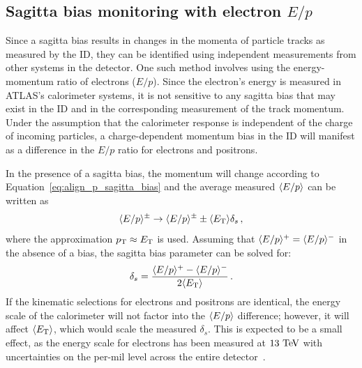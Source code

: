 \subsection{Sagitta bias monitoring with electron $E/p$}\label{align:eop}
Since a sagitta bias results in changes in the momenta of particle tracks as measured by the ID, they can be identified using independent measurements from other systems in the detector.
One such method involves using the energy-momentum ratio of electrons ($E/p$).
Since the electron's energy is measured in ATLAS's calorimeter systems, it is not sensitive to any sagitta bias that may exist in the ID and in the corresponding measurement of the track momentum.
Under the assumption that the calorimeter response is independent of the charge of incoming particles, a charge-dependent momentum bias in the ID will manifest as a difference in the $E/p$ ratio for electrons and positrons.%

In the presence of a sagitta bias, the momentum will change according to Equation~\ref{eq:align_p_sagitta_bias} and the average measured $\langle E/p\rangle$ can be written as
\begin{equation}
  \langle E/p\rangle^{\pm}\rightarrow\langle E/p\rangle^{\pm}\pm\langle E_{\mathrm{T}}\rangle\delta_s\,,
\end{equation}
where the approximation $p_{\mathrm{T}}\approx E_{\mathrm{T}}$ is used.
Assuming that $\langle E/p\rangle^+ = \langle E/p\rangle^-$ in the absence of a bias, the sagitta bias parameter can be solved for:
\begin{equation}
  \delta_s = \frac{\eop^+ - \eop^-}{2\langle\et\rangle}\,.
\label{eq:align_eop_sagitta}
\end{equation}
If the kinematic selections for electrons and positrons are identical, the energy scale of the calorimeter will not factor into the $\langle E/p\rangle$ difference; however, it will affect $\langle E_{\mathrm{T}}\rangle$, which would scale the measured $\delta_s$.
This is expected to be a small effect, as the energy scale for electrons has been measured at $13\tev$ with uncertainties on the per-mil level across the entire detector~\cite{2016.electron-photon-calibration}.

